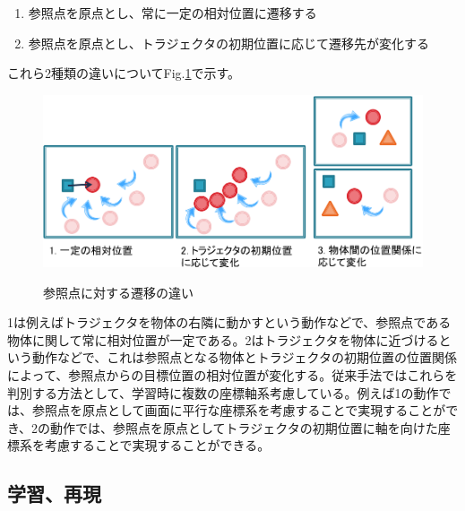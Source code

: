 	\begin{enumerate}
		\item 参照点を原点とし、常に一定の相対位置に遷移する
		\item 参照点を原点とし、トラジェクタの初期位置に応じて遷移先が変化する
	\end{enumerate}
これら2種類の違いについてFig.\ref{figure:2_difference_displacement}で示す。
	\begin{figure}[t]
		\begin{center}
			\includegraphics[width=14cm]{figure2.png} \\ %
			\caption{参照点に対する遷移の違い}
			\label{figure:2_difference_displacement}
		\end{center}
	\end{figure}
1は例えばトラジェクタを物体の右隣に動かすという動作などで、参照点である物体に関して常に相対位置が一定である。2はトラジェクタを物体に近づけるという動作などで、これは参照点となる物体とトラジェクタの初期位置の位置関係によって、参照点からの目標位置の相対位置が変化する。従来手法ではこれらを判別する方法として、学習時に複数の座標軸系考慮している。例えば1の動作では、参照点を原点として画面に平行な座標系を考慮することで実現することができ、2の動作では、参照点を原点としてトラジェクタの初期位置に軸を向けた座標系を考慮することで実現することができる。

\subsection{学習、再現}

